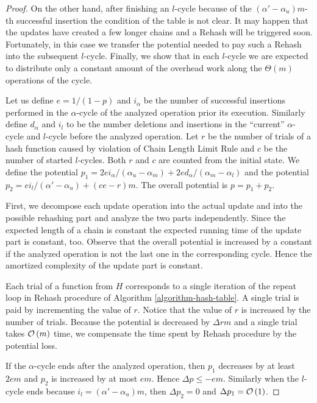 \begin{proof}
On the other hand, after finishing an $l$-cycle because of the $(\alpha'-\alpha_u)m$-th successful insertion the condition of the table is not clear.
It may happen that the updates have created a few longer chains and a Rehash will be triggered soon. 
Fortunately, in this case we transfer the potential needed to pay such a Rehash into the subsequent $l$-cycle.
Finally, we show that in each $l$-cycle we are expected to distribute only a constant amount of the overhead work along the $\Theta(m)$ operations of the cycle.

Let us define $e = 1/(1-p)$ and $i_\alpha$ be the number of successful insertions performed in the $\alpha$-cycle of the analyzed operation prior its execution. 
Similarly define $d_\alpha$ and $i_l$ to be the number deletions and insertions in the ``current'' $\alpha$-cycle and $l$-cycle before the analyzed operation.
Let $r$ be the number of trials of a hash function caused by violation of Chain Length Limit Rule and $c$ be the number of started $l$-cycles.
Both $r$ and $c$ are counted from the initial state.
We define the potential $p_1 = {2ei_{\alpha}}/{(\alpha_u - \alpha_m)} + {2ed_{\alpha}}/{(\alpha_m - \alpha_l)}$ and the potential $p_2 = {ei_{l}}/{(\alpha' - \alpha_u)} + (ce - r) m$.
The overall potential is $p = p_1 + p_2$.

First, we decompose each update operation into the actual update and into the possible rehashing part and analyze the two parts independently.
Since the expected length of a chain is constant the expected running time of the update part is constant, too.
Observe that the overall potential is increased by a constant if the analyzed operation is not the last one in the corresponding cycle. 
Hence the amortized complexity of the update part is constant. 

Each trial of a function from $H$ corresponds to a single iteration of the repeat loop in Rehash procedure of Algorithm \ref{algorithm-hash-table}.
A single trial is paid by incrementing the value of $r$. 
Notice that the value of $r$ is increased by the number of trials.
Because the potential is decreased by $\Delta rm$ and a single trial takes $\mathcal{O}\left(m\right)$ time, we compensate the time spent by Rehash procedure by the potential loss.

If the $\alpha$-cycle ends after the analyzed operation, then $p_1$ decreases by at least $2em$ and $p_2$ is increased by at most $em$.
Hence $\Delta p \leq -em$.
Similarly when the $l$-cycle ends because $i_l = (\alpha' - \alpha_u)m$, then $\Delta p_2 = 0$ and $\Delta p_1 = \mathcal{O}\left(1\right)$. 


\end{proof}
